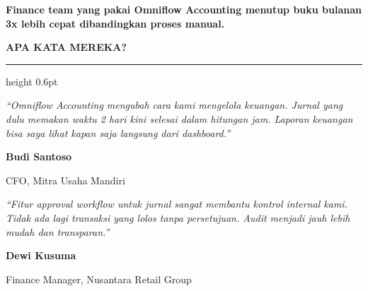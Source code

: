 \documentclass[a4paper]{article}
\newcommand{\sectiontitle}[1]{%
    \vspace{10pt}%
    {\fontsize{13}{16}\selectfont\bfseries\color{BlueDark} #1}\par\vspace{3pt}%
    {\color{BluePrimary}\hrule height 0.6pt}\par\vspace{8pt}%
}
\begin{document}
\vspace{8pt}

{\setlength{\fboxsep}{7pt}\setlength{\fboxrule}{0pt}%
\noindent\colorbox{TealPrimary}{%
    \begin{minipage}{\dimexpr\textwidth-2\fboxsep\relax}
        \centering
        {\fontsize{9.5}{12}\selectfont\bfseries\color{White}
        Finance team yang pakai Omniflow Accounting menutup buku bulanan \textbf{3x lebih cepat} dibandingkan proses manual.}
    \end{minipage}}}

\vspace{8pt}
\sectiontitle{APA KATA MEREKA?}

\noindent
\begin{minipage}[t]{0.485\textwidth}
    \colorbox{BlueBg}{%
        \begin{minipage}{\dimexpr\linewidth-2\fboxsep\relax}
            {\fontsize{9.5}{13}\selectfont\color{TextDark}\textit{``Omniflow Accounting mengubah cara kami mengelola keuangan. Jurnal yang dulu memakan waktu 2 hari kini selesai dalam hitungan jam. Laporan keuangan bisa saya lihat kapan saja langsung dari dashboard.''}}\par\vspace{4pt}
            {\fontsize{8.5}{11}\selectfont\bfseries\color{BluePrimary} Budi Santoso}\par
            {\fontsize{8}{10}\selectfont\color{TextLight} CFO, Mitra Usaha Mandiri}
        \end{minipage}}
\end{minipage}%
\hfill
\begin{minipage}[t]{0.485\textwidth}
    \colorbox{BlueBg}{%
        \begin{minipage}{\dimexpr\linewidth-2\fboxsep\relax}
            {\fontsize{9.5}{13}\selectfont\color{TextDark}\textit{``Fitur approval workflow untuk jurnal sangat membantu kontrol internal kami. Tidak ada lagi transaksi yang lolos tanpa persetujuan. Audit menjadi jauh lebih mudah dan transparan.''}}\par\vspace{4pt}
            {\fontsize{8.5}{11}\selectfont\bfseries\color{BluePrimary} Dewi Kusuma}\par
            {\fontsize{8}{10}\selectfont\color{TextLight} Finance Manager, Nusantara Retail Group}
        \end{minipage}}
\end{minipage}

\restoregeometry
\end{document}
